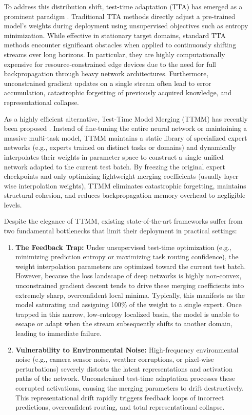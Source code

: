 \documentclass{article}
\theoremstyle{plain}
\theoremstyle{definition}
\theoremstyle{remark}
\begin{document}
To address this distribution shift, test-time adaptation (TTA) has emerged as a prominent paradigm \cite{wang2020tent, wang2022cotta, niu2022sar, yuan2023rotta}. Traditional TTA methods directly adjust a pre-trained model's weights during deployment using unsupervised objectives such as entropy minimization. While effective in stationary target domains, standard TTA methods encounter significant obstacles when applied to continuously shifting streams over long horizons. In particular, they are highly computationally expensive for resource-constrained edge devices due to the need for full backpropagation through heavy network architectures. Furthermore, unconstrained gradient updates on a single stream often lead to error accumulation, catastrophic forgetting of previously acquired knowledge, and representational collapse.

As a highly efficient alternative, Test-Time Model Merging (TTMM) has recently been proposed \cite{cpam2026, fdfdpa2026, bkcomerge2026}. Instead of fine-tuning the entire neural network or maintaining a massive multi-task model, TTMM maintains a static library of specialized expert networks (e.g., experts trained on distinct tasks or domains) and dynamically interpolates their weights in parameter space to construct a single unified network adapted to the current test batch. By freezing the original expert checkpoints and only optimizing lightweight merging coefficients (usually layer-wise interpolation weights), TTMM eliminates catastrophic forgetting, maintains structural cohesion, and reduces backpropagation memory overhead to negligible levels.

Despite the elegance of TTMM, existing state-of-the-art frameworks suffer from two fundamental bottlenecks that limit their deployment in practical settings:
\begin{enumerate}
    \item \textbf{The Feedback Trap:} Under unsupervised test-time optimization (e.g., minimizing prediction entropy or maximizing task routing confidence), the weight interpolation parameters are optimized toward the current test batch. However, because the loss landscape of deep networks is highly non-convex, unconstrained gradient descent tends to drive these merging coefficients into extremely sharp, overconfident local minima. Typically, this manifests as the model saturating and assigning 100\% of the weight to a single expert. Once trapped in this narrow, low-entropy localized basin, the model is unable to escape or adapt when the stream subsequently shifts to another domain, leading to immediate failure.
    \item \textbf{Vulnerability to Environmental Noise:} High-frequency environmental noise (e.g., camera sensor noise, weather corruptions, or pixel-wise perturbations) severely distorts the latent representations and activation paths of the network. Unconstrained test-time adaptation processes these corrupted activations, causing the merging parameters to drift destructively. This representational drift rapidly triggers feedback loops of incorrect predictions, overconfident routing, and total representational collapse.
\end{enumerate}
\end{document}
